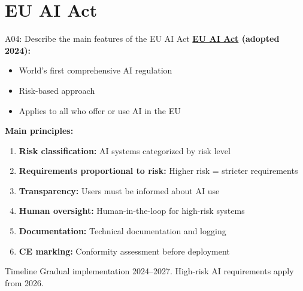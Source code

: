 \documentclass[aspectratio=169, 10pt]{beamer}
\begin{document}
\section{EU AI Act}

\begin{frame}{A04: Describe the main features of the EU AI Act}
    \textbf{\href{https://artificialintelligenceact.eu/}{EU AI Act} (adopted 2024):}
    \begin{itemize}
        \item World's first comprehensive AI regulation
        \item Risk-based approach
        \item Applies to all who offer or use AI in the EU
    \end{itemize}
    
    \vspace{0.3cm}
    \textbf{Main principles:}
    \begin{enumerate}
        \item \textbf{Risk classification:} AI systems categorized by risk level
        \item \textbf{Requirements proportional to risk:} Higher risk = stricter requirements
        \item \textbf{Transparency:} Users must be informed about AI use
        \item \textbf{Human oversight:} Human-in-the-loop for high-risk systems
        \item \textbf{Documentation:} Technical documentation and logging
        \item \textbf{CE marking:} Conformity assessment before deployment
    \end{enumerate}
    
    \vspace{0.3cm}
    \begin{block}{Timeline}
        Gradual implementation 2024--2027. High-risk AI requirements apply from 2026.
    \end{block}
\end{frame}
\end{document}

